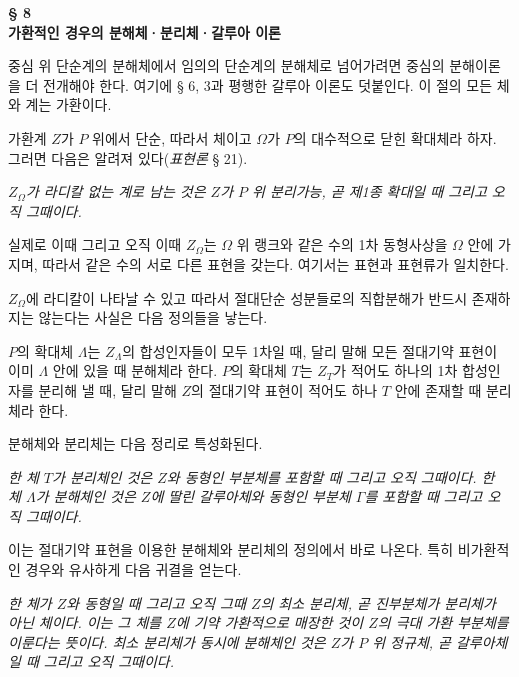 \begin{center}
\textbf{§ 8}\\[0.35em]
\textbf{가환적인 경우의 분해체·분리체·갈루아 이론}
\end{center}

중심 위 단순계의 분해체에서 임의의 단순계의 분해체로 넘어가려면 중심의 분해이론을 더 전개해야 한다. 여기에 § 6, 3과 평행한 갈루아 이론도 덧붙인다. 이 절의 모든 체와 계는 가환이다.

\noindent\textbf{}\quad 가환계 \(Z\)가 \(P\) 위에서 단순, 따라서 체이고 \(\Omega\)가 \(P\)의 대수적으로 닫힌 확대체라 하자. 그러면 다음은 알려져 있다(\emph{표현론} § 21).

\noindent\emph{\(Z_\Omega\)가 라디칼 없는 계로 남는 것은 \(Z\)가 \(P\) 위 분리가능, 곧 제1종 확대일 때 그리고 오직 그때이다.}

실제로 이때 그리고 오직 이때 \(Z_\Omega\)는 \(\Omega\) 위 랭크와 같은 수의 1차 동형사상을 \(\Omega\) 안에 가지며, 따라서 같은 수의 서로 다른 표현을 갖는다. 여기서는 표현과 표현류가 일치한다.

\(Z_\Omega\)에 라디칼이 나타날 수 있고 따라서 절대단순 성분들로의 직합분해가 반드시 존재하지는 않는다는 사실은 다음 정의들을 낳는다.

\noindent\textbf{}\quad \(P\)의 확대체 \(\Lambda\)는 \(Z_\Lambda\)의 합성인자들이 모두 1차일 때, 달리 말해 모든 절대기약 표현이 이미 \(\Lambda\) 안에 있을 때 분해체라 한다. \(P\)의 확대체 \(T\)는 \(Z_T\)가 적어도 하나의 1차 합성인자를 분리해 낼 때, 달리 말해 \(Z\)의 절대기약 표현이 적어도 하나 \(T\) 안에 존재할 때 분리체라 한다.

분해체와 분리체는 다음 정리로 특성화된다.

\noindent\textbf{} \emph{한 체 \(T\)가 분리체인 것은 \(Z\)와 동형인 부분체를 포함할 때 그리고 오직 그때이다. 한 체 \(\Lambda\)가 분해체인 것은 \(Z\)에 딸린 갈루아체와 동형인 부분체 \(\Gamma\)를 포함할 때 그리고 오직 그때이다.}

이는 절대기약 표현을 이용한 분해체와 분리체의 정의에서 바로 나온다. 특히 비가환적인 경우와 유사하게 다음 귀결을 얻는다.

\noindent\textbf{} \emph{한 체가 \(Z\)와 동형일 때 그리고 오직 그때 \(Z\)의 최소 분리체, 곧 진부분체가 분리체가 아닌 체이다. 이는 그 체를 \(Z\)에 기약 가환적으로 매장한 것이 \(Z\)의 극대 가환 부분체를 이룬다는 뜻이다. 최소 분리체가 동시에 분해체인 것은 \(Z\)가 \(P\) 위 정규체, 곧 갈루아체일 때 그리고 오직 그때이다.}

